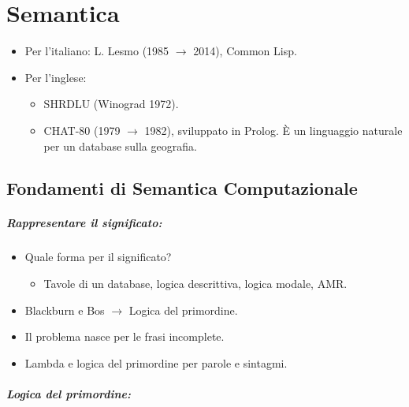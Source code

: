 \chapter{Semantica}



\begin{itemize}
  \item Per l'italiano: L. Lesmo (1985 $\rightarrow$ 2014), Common Lisp.
  \item Per l'inglese: 
    \begin{itemize}
      \item SHRDLU (Winograd 1972). 
      \item CHAT-80 (1979 $\rightarrow$ 1982), sviluppato in Prolog. È un linguaggio naturale per un database sulla geografia.
    \end{itemize}
\end{itemize}

\section{Fondamenti di Semantica Computazionale}


\paragraph{Rappresentare il significato:}

\begin{itemize}
  \item Quale forma per il significato?
    \begin{itemize}
      \item Tavole di un database, logica descrittiva, logica modale, AMR. 
    \end{itemize}
  \item Blackburn e Bos $\rightarrow$ Logica del primordine. 
  \item Il problema nasce per le frasi incomplete. 
  \item Lambda e logica del primordine per parole e sintagmi.
\end{itemize}

\paragraph{Logica del primordine:}

